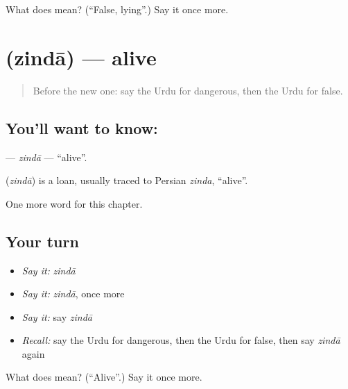 \begin{tcolorbox}[breakable,colback=teal!4,colframe=teal!35!black,title={Before you move on}]
What does  mean? (\textquotedblleft{}False, lying\textquotedblright{}.) Say it once more.
\end{tcolorbox}
\section[\texorpdfstring{\ur{زندہ} (zindā)}{زندہ (zindā)}]{ (zindā) — alive}

\label{lesson:UR-C248-zinda}



\begin{quote}
Before the new one: say the Urdu for dangerous, then the Urdu for false.
\end{quote}

\subsection*{You'll want to know: }
\textbf{} — \emph{zindā} — \textquotedblleft{}alive\textquotedblright{}.

\begin{cousinweb}
\textbf{} (\emph{zindā}) is a loan, usually traced to Persian \emph{zinda}, \textquotedblleft{}alive\textquotedblright{}.
\end{cousinweb}

\begin{grammarlens}[title={What you've built}]
One more word for this chapter.
\end{grammarlens}

\subsection*{Your turn}
\begin{itemize}
\raggedright
  \item \emph{Say it:} \emph{zindā}
  \item \emph{Say it:} \emph{zindā}, once more
  \item \emph{Say it:} say \emph{zindā}
  \item \emph{Recall:} say the Urdu for dangerous, then the Urdu for false, then say \emph{zindā} again
\end{itemize}

\begin{tcolorbox}[breakable,colback=teal!4,colframe=teal!35!black,title={Before you move on}]
What does  mean? (\textquotedblleft{}Alive\textquotedblright{}.) Say it once more.
\end{tcolorbox}
